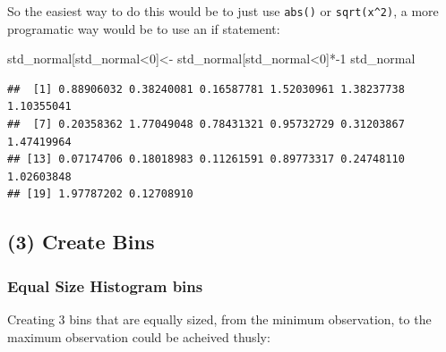 \documentclass[]{article}
\newenvironment{Shaded}{}{}
\newcommand{\CommentTok}[1]{\textcolor[rgb]{0.38,0.63,0.69}{\textit{#1}}}
\newcommand{\DataTypeTok}[1]{\textcolor[rgb]{0.56,0.13,0.00}{#1}}
\newcommand{\DecValTok}[1]{\textcolor[rgb]{0.25,0.63,0.44}{#1}}
\newcommand{\KeywordTok}[1]{\textcolor[rgb]{0.00,0.44,0.13}{\textbf{#1}}}
\newcommand{\NormalTok}[1]{#1}
\newcommand{\OperatorTok}[1]{\textcolor[rgb]{0.40,0.40,0.40}{#1}}
\newcommand{\StringTok}[1]{\textcolor[rgb]{0.25,0.44,0.63}{#1}}
\begin{document}
So the easiest way to do this would be to just use \texttt{abs()} or
\texttt{sqrt(x\^{}2)}, a more programatic way would be to use an if
statement:

\begin{Shaded}
\begin{Highlighting}[]
\NormalTok{std_normal[std_normal}\OperatorTok{<}\DecValTok{0}\NormalTok{]<-}\StringTok{ }\NormalTok{std_normal[std_normal}\OperatorTok{<}\DecValTok{0}\NormalTok{]}\OperatorTok{*-}\DecValTok{1}
\NormalTok{std_normal}
\end{Highlighting}
\end{Shaded}

\begin{verbatim}
##  [1] 0.88906032 0.38240081 0.16587781 1.52030961 1.38237738 1.10355041
##  [7] 0.20358362 1.77049048 0.78431321 0.95732729 0.31203867 1.47419964
## [13] 0.07174706 0.18018983 0.11261591 0.89773317 0.24748110 1.02603848
## [19] 1.97787202 0.12708910
\end{verbatim}

\hypertarget{create-bins}{%
\subsection{(3) Create Bins}\label{create-bins}}

\hypertarget{equal-size-histogram-bins}{%
\subsubsection{Equal Size Histogram
bins}\label{equal-size-histogram-bins}}

Creating 3 bins that are equally sized, from the minimum observation, to
the maximum observation could be acheived thusly:

\begin{Shaded}
\end{Shaded}
\end{document}
